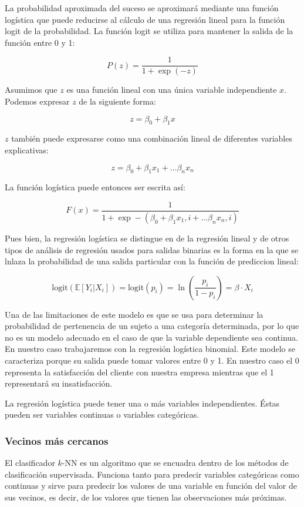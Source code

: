 \documentclass[11pt,a4paper,spanish]{article} %
\begin{document}
La probabilidad aproximada del suceso se aproximará mediante una función logística que puede reducirse al cálculo de una regresión lineal para la función logit de la probabilidad. La función logit se utiliza para mantener la salida de la función entre 0 y 1:

$$P(z) = \frac{1}{1 + \exp(-z)}$$

Asumimos que $z$ es una función lineal con una única variable independiente $x$. Podemos expresar $z$ de la siguiente forma:

$$z = \beta_0 + \beta_1 x $$

$z$ también puede expresarse como una combinación lineal de diferentes variables explicativas:

$$z = \beta_0 + \beta_1 x_1 +  ... \beta_n x_n $$

La función logística puede entonces ser escrita así:

$$F(x) = \frac{1}{1+ \exp-(\beta_0 + \beta_1 x_1,i + ... \beta_n x_n,i)}$$

Pues bien, la regresión logística se distingue en de la regresión lineal y de otros tipos de análisis de regresión usados para salidas binarias es la forma en la que se lnlaza la probabilidad de una salida particular con la función de prediccion lineal:

$$\mbox{logit}(\mathbb{E}[Y_i | X_i]) = \mbox{logit}(p_i) = \ln{\left(\frac{p_i}{1-p_i}\right)} = \beta · X_i $$ 

Una de las limitaciones de este modelo es que se usa para determinar la probabilidad de pertenencia de un sujeto a una categoría determinada, por lo que no es un modelo adecuado en el caso de que la variable dependiente sea continua. En nuestro caso trabajaremos con la regresión logística binomial. Este modelo se caracteriza porque su salida puede tomar valores entre 0 y 1. En nuestro caso el 0 representa la satisfacción del cliente con nuestra empresa mientras que el 1 representará su insatisfacción.

\newpage

La regresión logística puede tener una o más variables independientes. Éstas pueden ser variables continuas o variables categóricas. 


\subsubsection{Vecinos más cercanos}
El clasificador $k$-NN es un algoritmo que se encuadra dentro de los métodos de clasificación supervisada. Funciona tanto para predecir variables categóricas como continuas y sirve para predecir los valores de una variable en función del valor de sus vecinos, es decir, de los valores que tienen las observaciones más próximas. 
\end{document}
